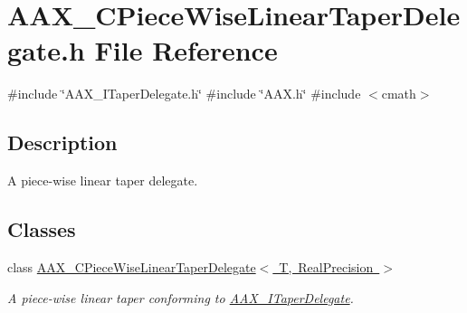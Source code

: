 \hypertarget{a00464}{}\section{A\+A\+X\+\_\+\+C\+Piece\+Wise\+Linear\+Taper\+Delegate.\+h File Reference}
\label{a00464}
{\ttfamily \#include \char`\"{}A\+A\+X\+\_\+\+I\+Taper\+Delegate.\+h\char`\"{}}\newline
{\ttfamily \#include \char`\"{}A\+A\+X.\+h\char`\"{}}\newline
{\ttfamily \#include $<$cmath$>$}\newline


\subsection{Description}
A piece-\/wise linear taper delegate. 

\subsection*{Classes}
\begin{DoxyCompactItemize}
\item 
class \mbox{\hyperlink{a01553}{A\+A\+X\+\_\+\+C\+Piece\+Wise\+Linear\+Taper\+Delegate$<$ T, Real\+Precision $>$}}
\begin{DoxyCompactList}\small\item\em A piece-\/wise linear taper conforming to \mbox{\hyperlink{a01881}{A\+A\+X\+\_\+\+I\+Taper\+Delegate}}. \end{DoxyCompactList}\end{DoxyCompactItemize}
